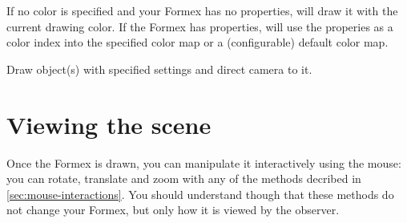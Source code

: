 If no color is specified and your Formex has no properties, \pyformex will draw it with the current drawing color. If the Formex has properties, \pyformex will use the properies as a color index into the specified color map or a (configurable) default color map.

Draw object(s) with specified settings and direct camera to it.







 
\section{Viewing the scene}
Once the Formex is drawn, you can manipulate it interactively using the mouse: you can rotate, translate and zoom with any of the methods decribed in \ref{sec:mouse-interactions}. You should understand though that these methods do not change your Formex, but only how it is viewed by the observer. 

